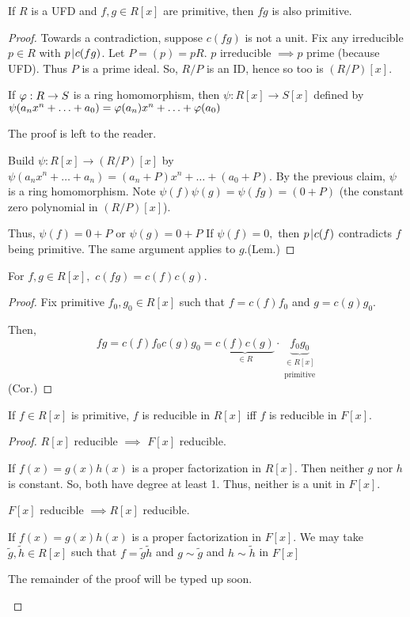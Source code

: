 \documentclass[notes.tex]{subfiles}
\begin{document}
\begin{lemma}[Gauss]
	If $R$ is a UFD and $f, g\in R[x]$ are primitive, then $fg$ is also primitive.
\end{lemma}
\begin{proof}
	Towards a contradiction, suppose $c(fg)$ is not a unit. Fix any irreducible $p\in R$ with $p\mkern2mu|\mkern1mu c(fg)$. Let $P = (p) = pR$. $p$ irreducible $\implies p$ prime (because UFD). Thus $P$ is a prime ideal. So, $R/P$ is an ID, hence so too is $(R/P)[x]$.

	\begin{claim}
		If $\varphi:R\to S$ is a ring homomorphism, then $\psi:R[x]\to S[x]$ defined by $\psi(a_nx^n + \ldots + a_0) = \varphi(a_n)x^n + \ldots + \varphi(a_0)$
	\end{claim}
	The proof is left to the reader.

	Build $\psi : R[x] \to(R/P)[x]$  by $\psi(a_nx^n + \ldots + a_n) = (a_n + P)x^n + \ldots + (a_0 + P)$. By the previous claim, $\psi$ is a ring homomorphism. Note $\psi(f)\psi(g) = \psi(fg) = (0 + P)$ (the constant zero polynomial in $(R/P)[x]$).

	Thus, $\psi(f) = 0+P$ or $\psi(g) = 0+P$ If $\psi(f) = 0,$ then $p\mkern2mu|\mkern1mu c(f)$ contradicts $f$ being primitive. The same argument applies to $g$.\qedhere(Lem.)
\end{proof}
\begin{corollary}
	For $f, g\in R[x],$ $c(fg) = c(f)c(g)$. 
\end{corollary}
\begin{proof}
	Fix primitive $f_0, g_0\in R[x]$ such that $f=c(f)f_0$ and $g=c(g)g_0$.

	Then, \[
		fg = c(f)f_0 c(g)g_0 = \underbrace{c(f)c(g)}_{\in R} \cdot \underbrace{f_0g_0}_{\substack{\in R[x]\\\text{primitive}}}
	\]\qedhere(Cor.)
\end{proof}

\begin{proposition}
	If $f\in R[x]$ is primitive, $f$ is reducible in $R[x]$ iff $f$ is reducible in $F[x].$
\end{proposition}
\begin{proof}
	$R[x]$ reducible $\implies$ $F[x]$ reducible.
	\begin{tabin}
		If $f(x) = g(x)h(x)$ is a proper factorization in $R[x]$. Then neither $g$ nor $h$ is constant. So, both have degree at least 1. Thus, neither is a unit in $F[x]$.
	\end{tabin}

	$F[x]$ reducible $\implies R[x]$ reducible.
	\begin{tabin}
		If $f(x) = g(x)h(x)$ is a proper factorization in $F[x]$.
		We may take $\tilde g, \tilde h \in R[x]$ such that 
			$f=\tilde g\tilde h$ and $g\sim\tilde g$ and $h\sim\tilde h$ in $F[x]$ 

		The remainder of the proof will be typed up soon.
	\end{tabin}
\end{proof}
\end{document}
